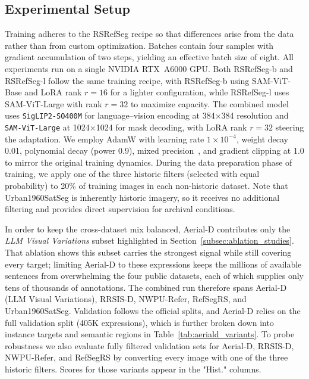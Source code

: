 \subsection{Experimental Setup}
\label{subsec:experimental_setup}

Training adheres to the RSRefSeg recipe so that differences arise from the data rather than from custom optimization. Batches contain four samples with gradient accumulation of two steps, yielding an effective batch size of eight. All experiments run on a single NVIDIA RTX~A6000 GPU. Both RSRefSeg-b and RSRefSeg-l follow the same training recipe, with RSRefSeg-b using SAM-ViT-Base and LoRA rank \(r=16\) for a lighter configuration, while RSRefSeg-l uses SAM-ViT-Large with rank \(r=32\) to maximize capacity. The combined model uses \texttt{SigLIP2-SO400M} for language–vision encoding at 384×384 resolution and \texttt{SAM-ViT-Large} at 1024×1024 for mask decoding, with LoRA rank \(r=32\) steering the adaptation. We employ AdamW\cite{adamw} with learning rate $1\times10^{-4}$, weight decay 0.01, polynomial decay (power 0.9), mixed precision~\cite{mixedprecision}, and gradient clipping at 1.0 to mirror the original training dynamics. During the data preparation phase of training, we apply one of the three historic filters (selected with equal probability) to 20\% of training images in each non-historic dataset. Note that Urban1960SatSeg is inherently historic imagery, so it receives no additional filtering and provides direct supervision for archival conditions.

In order to keep the cross-dataset mix balanced, Aerial-D contributes only the \emph{LLM Visual Variations} subset highlighted in Section~\ref{subsec:ablation_studies}. That ablation shows this subset carries the strongest signal while still covering every target; limiting Aerial-D to these expressions keeps the millions of available sentences from overwhelming the four public datasets, each of which supplies only tens of thousands of annotations. The combined run therefore spans Aerial-D (LLM Visual Variations), RRSIS-D\cite{liu2024rotated}, NWPU-Refer\cite{yang2024large}, RefSegRS\cite{yuan2023rrsis}, and Urban1960SatSeg\cite{hao2025urban1960satseg}. Validation follows the official splits, and Aerial-D relies on the full validation split (405K expressions), which is further broken down into instance targets and semantic regions in Table~\ref{tab:aeriald_variants}. To probe robustness we also evaluate fully filtered validation sets for Aerial-D, RRSIS-D, NWPU-Refer, and RefSegRS by converting every image with one of the three historic filters. Scores for those variants appear in the "Hist." columns.

